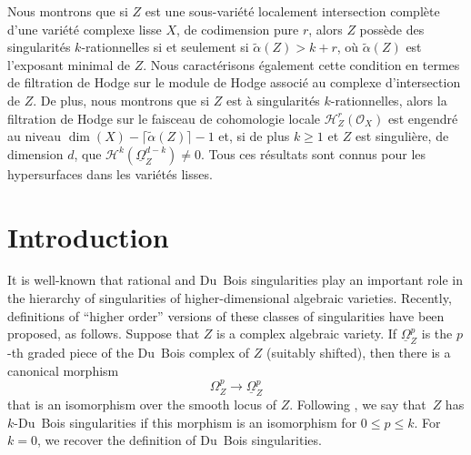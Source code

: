 \documentclass[JEP,XML,SOM,Unicode]{cedram}
\theoremstyle{plain}
\theoremstyle{definition}
\newcommand\cH{\mathcal{H}}
\newcommand\cO{\mathcal{O}}
\newcommand\cH{\mathcal{H}}
\newcommand\cO{\mathcal{O}}
\begin{document}


\begin{altabstract}
Nous montrons que si $Z$ est une sous-variété localement intersection complète d'une variété complexe lisse $X$, de codimension pure $r$, alors $Z$ possède des singularités $k$-rationnelles si et seulement si $\widetilde{\alpha}(Z)>k+r$, où $\widetilde{\alpha}(Z)$ est l'exposant minimal de $Z$. Nous caractérisons également cette condition en termes de filtration de Hodge sur le module de Hodge associé au complexe d'intersection de $Z$. De plus, nous montrons que si $Z$ est à singularités $k$-rationnelles, alors la filtration de Hodge sur le faisceau de cohomologie locale $\cH^r_Z(\cO_X)$ est engendré au niveau $\dim(X)-\lceil \widetilde{\alpha}(Z)\rceil-1$ et, si de plus $k\geq 1$ et $Z$ est singulière, de dimension $d$, que $\cH^k(\underline{\Omega}_Z^{d-k})\neq 0$. Tous ces résultats sont connus pour les hypersurfaces dans les variétés lisses.
\end{altabstract}

\maketitle
\tableofcontents
\mainmatter

\section{Introduction}

It is well-known that rational and Du~Bois singularities play an important role in the hierarchy of singularities of higher-dimensional algebraic varieties.
Recently, definitions of ``higher order'' versions of these classes of singularities have been proposed, as follows. Suppose that $Z$ is a complex algebraic variety.
If $\underline{\Omega}_Z^p$ is the $p$-th graded piece of the Du~Bois complex of $Z$ (suitably shifted), then there is a canonical morphism
\[\Omega_Z^p\to\underline{\Omega}_Z^p\]
that is an isomorphism over the smooth locus of $Z$. Following \cite{Saito_et_al}, we say that~$Z$ has $k$-Du~Bois singularities if this morphism is an isomorphism
for $0\leq p\leq k$. For $k=0$, we recover the definition of Du~Bois singularities.
\end{document}
